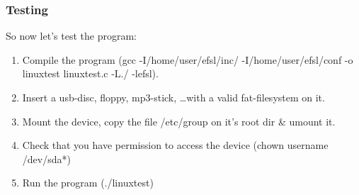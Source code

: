 \subsubsection{Testing}
So now let's test the program:
\begin{enumerate}
	\item{Compile the program
		(gcc -I/home/user/efsl/inc/ -I/home/user/efsl/conf -o linuxtest
		linuxtest.c -L./ -lefsl).}
	\item{Insert a usb-disc, floppy, mp3-stick, \ldots with a valid
		fat-filesystem on it.}
	\item{Mount the device, copy the file /etc/group on it's root dir \& umount
		it.}
	\item{Check that you have permission to access the device
		(chown username /dev/sda*)}
	\item{Run the program (./linuxtest)}
\end{enumerate}











